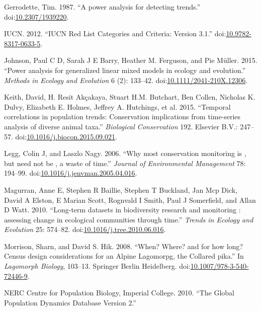 \documentclass[12pt,]{article}
\begin{document}
\hypertarget{ref-Gerrodette1987}{}
Gerrodette, Tim. 1987. ``A power analysis for detecting trends.''
doi:\href{https://doi.org/10.2307/1939220}{10.2307/1939220}.

\hypertarget{ref-IUCN2012}{}
IUCN. 2012. ``IUCN Red List Categories and Criteria: Version 3.1.''
doi:\href{https://doi.org/10.9782-8317-0633-5}{10.9782-8317-0633-5}.

\hypertarget{ref-Johnson2015}{}
Johnson, Paul C D, Sarah J E Barry, Heather M. Ferguson, and Pie Müller.
2015. ``Power analysis for generalized linear mixed models in ecology
and evolution.'' \emph{Methods in Ecology and Evolution} 6 (2): 133--42.
doi:\href{https://doi.org/10.1111/2041-210X.12306}{10.1111/2041-210X.12306}.

\hypertarget{ref-Keith2015}{}
Keith, David, H. Resit Akçakaya, Stuart H.M. Butchart, Ben Collen,
Nicholas K. Dulvy, Elizabeth E. Holmes, Jeffrey A. Hutchings, et al.
2015. ``Temporal correlations in population trends: Conservation
implications from time-series analysis of diverse animal taxa.''
\emph{Biological Conservation} 192. Elsevier B.V.: 247--57.
doi:\href{https://doi.org/10.1016/j.biocon.2015.09.021}{10.1016/j.biocon.2015.09.021}.

\hypertarget{ref-Legg2006}{}
Legg, Colin J, and Laszlo Nagy. 2006. ``Why most conservation monitoring
is , but need not be , a waste of time.'' \emph{Journal of Environmental
Management} 78: 194--99.
doi:\href{https://doi.org/10.1016/j.jenvman.2005.04.016}{10.1016/j.jenvman.2005.04.016}.

\hypertarget{ref-Magurran2010}{}
Magurran, Anne E, Stephen R Baillie, Stephen T Buckland, Jan Mcp Dick,
David A Elston, E Marian Scott, Rognvald I Smith, Paul J Somerfield, and
Allan D Watt. 2010. ``Long-term datasets in biodiversity research and
monitoring : assessing change in ecological communities through time.''
\emph{Trends in Ecology and Evolution} 25: 574--82.
doi:\href{https://doi.org/10.1016/j.tree.2010.06.016}{10.1016/j.tree.2010.06.016}.

\hypertarget{ref-Morrison2008}{}
Morrison, Sharn, and David S. Hik. 2008. ``When? Where? and for how
long? Census design considerations for an Alpine Lagomorpg, the Collared
pika.'' In \emph{Lagomorph Biology}, 103--13. Springer Berlin
Heidelberg.
doi:\href{https://doi.org/10.1007/978-3-540-72446-9}{10.1007/978-3-540-72446-9}.

\hypertarget{ref-GPDD2010}{}
NERC Centre for Population Biology, Imperial College. 2010. ``The Global
Population Dynamics Database Version 2.''
\end{document}
